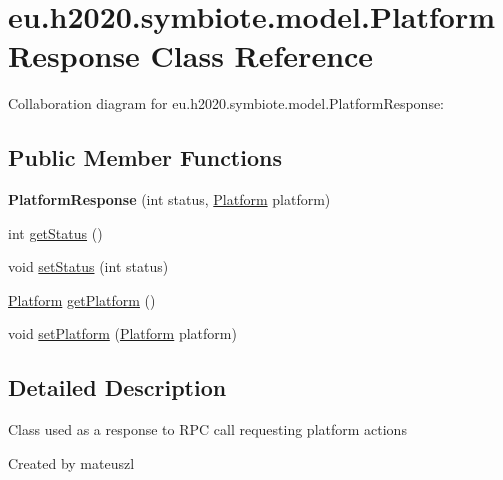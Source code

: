 \hypertarget{classeu_1_1h2020_1_1symbiote_1_1model_1_1PlatformResponse}{}\section{eu.\+h2020.\+symbiote.\+model.\+Platform\+Response Class Reference}
\label{classeu_1_1h2020_1_1symbiote_1_1model_1_1PlatformResponse}


Collaboration diagram for eu.\+h2020.\+symbiote.\+model.\+Platform\+Response\+:
\subsection*{Public Member Functions}
\begin{DoxyCompactItemize}
\item 
{\bfseries Platform\+Response} (int status, \hyperlink{classeu_1_1h2020_1_1symbiote_1_1model_1_1Platform}{Platform} platform)\hypertarget{classeu_1_1h2020_1_1symbiote_1_1model_1_1PlatformResponse_a50bf9ab9f6e33d7867ae3b9f45f5a857}{}\label{classeu_1_1h2020_1_1symbiote_1_1model_1_1PlatformResponse_a50bf9ab9f6e33d7867ae3b9f45f5a857}

\item 
int \hyperlink{classeu_1_1h2020_1_1symbiote_1_1model_1_1PlatformResponse_a36426fc2903fd48bb259295fb8421b9a}{get\+Status} ()
\item 
void \hyperlink{classeu_1_1h2020_1_1symbiote_1_1model_1_1PlatformResponse_a5266400d912196cf753e8c9ee40af151}{set\+Status} (int status)
\item 
\hyperlink{classeu_1_1h2020_1_1symbiote_1_1model_1_1Platform}{Platform} \hyperlink{classeu_1_1h2020_1_1symbiote_1_1model_1_1PlatformResponse_acf4b4148d28e4fcf1e041e1a58937ac3}{get\+Platform} ()
\item 
void \hyperlink{classeu_1_1h2020_1_1symbiote_1_1model_1_1PlatformResponse_ae3bfb1ea81733222dae4118c68b7917e}{set\+Platform} (\hyperlink{classeu_1_1h2020_1_1symbiote_1_1model_1_1Platform}{Platform} platform)
\end{DoxyCompactItemize}


\subsection{Detailed Description}
Class used as a response to R\+PC call requesting platform actions

Created by mateuszl 

